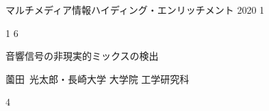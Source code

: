 \documentclass[a4paper,uplatex,12pt]{jsarticle}
\begin{document}
\vspace*{-7.5zh}\hspace*{-5zw}
{\small マルチメディア情報ハイディング・エンリッチメント}
\hspace*{8zw}
2020
\hspace*{2zw}
1

\vspace{3zh}

\begin{minipage}[t]{0.5\textwidth}
	\hspace*{-3zw}
	\phantom{投稿締切日}
	1
	\phantom{月}\hspace{1zw}
	6
	\phantom{日}
\end{minipage}
\begin{minipage}[t]{0.5\textwidth}
	\phantom{EMM-000}
\end{minipage}	

\vspace*{6zh}
音響信号の非現実的ミックスの検出

\vspace*{7zh}
薗田~光太郎・長崎大学 大学院 工学研究科

\vspace*{2zh}
\hspace*{1.5zw}
4
\phantom{枚}
\end{document}
